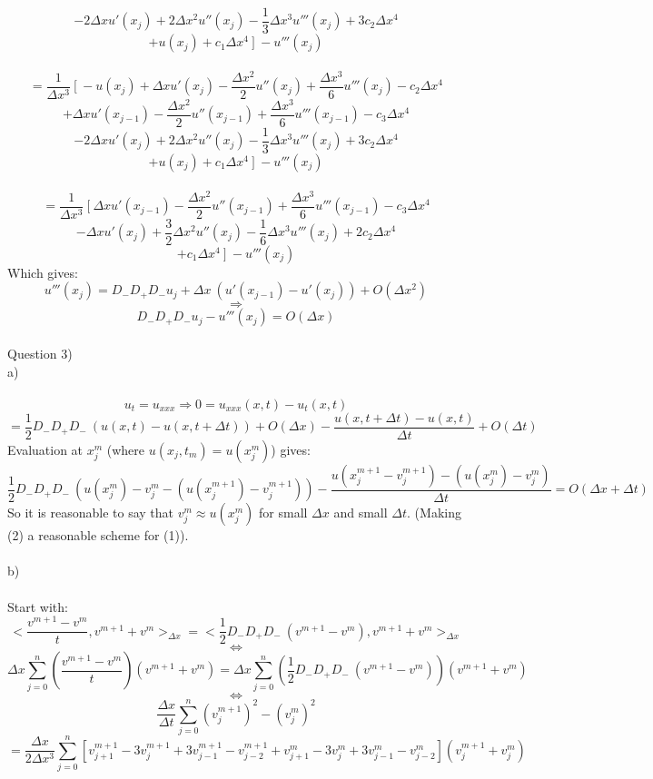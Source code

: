 \documentclass[12pt, letterpaper, twoside]{article}
\begin{document}
$$
- 2\Delta x u'(x_j) + 2\Delta x^2 u''(x_j) - \frac{1}{3}\Delta x^3 u'''(x_j) + 3c_2\Delta x^4 
$$
$$
+ u(x_j) + c_1\Delta x^4\ ]\ -u'''(x_j)
$$
\newpage
\ \\
$$
=
\frac{1}{\Delta x^3}\ [\ 
- u(x_j) + \Delta x u'(x_j) - \frac{\Delta x^2}{2}u''(x_j) + \frac{\Delta x^3}{6}u'''(x_j) - c_2\Delta x^4
$$
$$
+ \Delta x u'(x_{j-1}) - \frac{\Delta x^2}{2}u''(x_{j-1}) + \frac{\Delta x^3}{6}u'''(x_{j-1}) - c_3\Delta x^4
$$
$$
- 2\Delta x u'(x_j) + 2\Delta x^2 u''(x_j) - \frac{1}{3}\Delta x^3 u'''(x_j) + 3c_2\Delta x^4 
$$
$$
+ u(x_j) + c_1\Delta x^4\ ]\ -u'''(x_j)
$$
\ \\
$$
= \frac{1}{\Delta x^3}\ [\ 
\Delta x u'(x_{j-1}) - \frac{\Delta x^2}{2}u''(x_{j-1}) + \frac{\Delta x^3}{6}u'''(x_{j-1}) - c_3\Delta x^4
$$
$$
-\Delta x u'(x_j) + \frac{3}{2}\Delta x^2 u''(x_j) - \frac{1}{6}\Delta x^3 u'''(x_j) + 2c_2\Delta x^4 
$$
$$
+ c_1\Delta x^4\ ]\ -u'''(x_j)
$$
Which gives:
$$
u'''(x_j) = D_-D_+D_-u_j + \Delta x\ (u'(x_{j-1}) - u'(x_j)) + O(\Delta x^2)
$$
$$
\Rightarrow
$$
$$
D_-D_+D_-u_j - u'''(x_j) = O(\Delta x)
$$
\newpage
\ \\
Question 3)\\
a)\\
\ \\
$$
u_t = u_{xxx} \Rightarrow 0 = u_{xxx}(x,t) - u_t(x,t) 
$$
$$
= \frac{1}{2} D_-D_+D_-\ (u(x,t) - u(x,t+\Delta t)) + O(\Delta x) - \frac{u(x,t+\Delta t) - u(x,t)}{\Delta t} + O(\Delta t)
$$
Evaluation at $x_j^m$ (where $u(x_j, t_m) = u(x_j^m)$) gives:
$$
\frac{1}{2} D_-D_+D_-\ (u(x_j^m) - v_j^m  - (u(x_j^{m+1}) - v_j^{m+1})) - \frac{u(x_j^{m+1} - v_j^{m+1}) - (u(x_j^m) - v_j^m)}{\Delta t} = O(\Delta x + \Delta t)
$$
So it is reasonable to say that $v_j^m \approx u(x_j^m)$ for small $\Delta x$ and small $\Delta t$. (Making (2) a reasonable scheme for (1)).\\
\ \\
b)\\
\ \\
Start with:
$$
<\frac{v^{m+1} - v^m}{t}, v^{m+1} + v^m>_{\Delta x}
=
<\frac{1}{2} D_-D_+D_-\ (v^{m+1} - v^m), v^{m+1} + v^m>_{\Delta x}
$$
$$
\iff
$$
$$
\Delta x \sum_{j=0}^n (\frac{v^{m+1} - v^m}{t}) (v^{m+1} + v^m)
=
\Delta x \sum_{j=0}^n (\frac{1}{2} D_-D_+D_-\ (v^{m+1} - v^m)) (v^{m+1} + v^m)
$$
$$
\iff
$$
$$
\frac{\Delta x}{\Delta t} \sum_{j=0}^n (v_j^{m+1})^2 - (v_j^m)^2
$$
$$
=
\frac{\Delta x}{2\Delta x^3} \sum_{j=0}^n [v_{j+1}^{m+1} - 3v_{j}^{m+1} + 3v_{j-1}^{m+1} - v_{j-2}^{m+1} + v_{j+1}^{m} - 3v_{j}^{m} + 3v_{j-1}^{m} - v_{j-2}^{m}] (v_j^{m+1} + v_j^m)
$$
\end{document}
